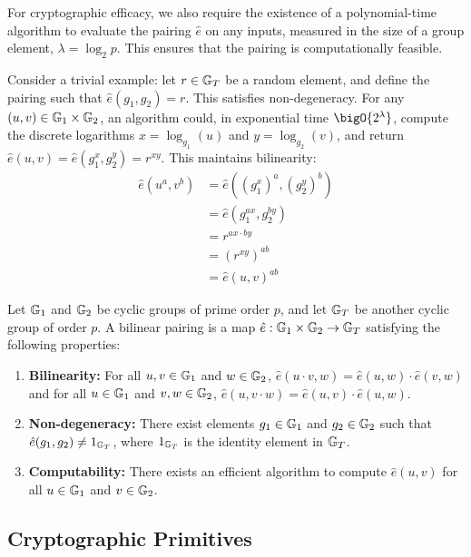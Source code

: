 \documentclass{iacrcc}
\begin{document}
For cryptographic efficacy, we also require the existence of a polynomial-time algorithm to evaluate the pairing \( \hat{e} \) on any inputs, measured in the size of a group element, \(\lambda = \log_2{p}\). This ensures that the pairing is computationally feasible.

Consider a trivial example: let \( r \in \mathbb{G}_T \) be a random element, and define the pairing such that \( \hat{e}(g_1, g_2) = r \). This satisfies non-degeneracy. For any \((u, v) \in \mathbb{G}_1 \times \mathbb{G}_2\), an algorithm could, in exponential time \( \bigO{2^\lambda} \), compute the discrete logarithms \( x = \log_{g_1}(u) \) and \( y = \log_{g_2}(v) \), and return \( \hat{e}(u, v) = \hat{e}(g_1^x, g_2^y) = r^{xy} \). This maintains bilinearity:
\begin{align*}
\hat{e}(u^a, v^b) & = \hat{e}\left((g_1^x)^a, (g_2^y)^b\right) \\
& = \hat{e}\left(g_1^{ax}, g_2^{by}\right)   \\
& = r^{ax \cdot by}                          \\
& = \left(r^{xy}\right)^{ab}                 \\
& = \hat{e}(u, v)^{ab}
\end{align*}

\begin{definition}
Let $\mathbb{G}_1$ and $\mathbb{G}_2$ be cyclic groups of prime order $p$, and let $\mathbb{G}_T$ be another cyclic group of order $p$. A bilinear pairing is a map $\hat{e}: \mathbb{G}_1 \times \mathbb{G}_2 \to \mathbb{G}_T$ satisfying the following properties:
\begin{enumerate}
\item \textbf{Bilinearity:} For all $u, v \in \mathbb{G}_1$ and $w \in \mathbb{G}_2$, $\hat{e}(u \cdot v, w) = \hat{e}(u, w) \cdot \hat{e}(v, w)$ and for all $u \in \mathbb{G}_1$ and $v, w \in \mathbb{G}_2$, $\hat{e}(u, v \cdot w) = \hat{e}(u, v) \cdot \hat{e}(u, w)$.
\item \textbf{Non-degeneracy:} There exist elements $g_1 \in \mathbb{G}_1$ and $g_2 \in \mathbb{G}_2$ such that $\hat{e}(g_1, g_2) \neq 1_{\mathbb{G}_T}$, where $1_{\mathbb{G}_T}$ is the identity element in $\mathbb{G}_T$.
\item \textbf{Computability:} There exists an efficient algorithm to compute $\hat{e}(u, v)$ for all $u \in \mathbb{G}_1$ and $v \in \mathbb{G}_2$.
\end{enumerate}

\end{definition}

\subsection{Cryptographic Primitives}
\end{document}
